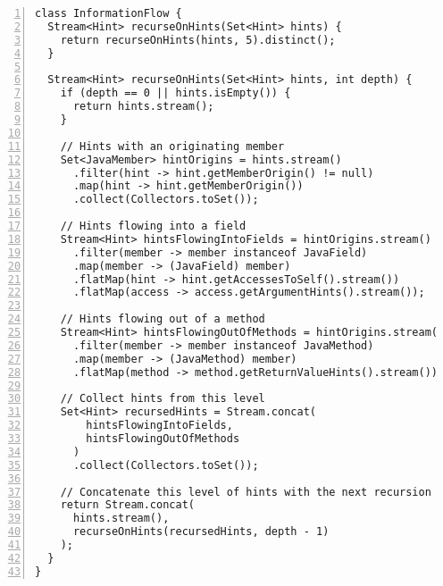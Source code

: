 \clearpage
\begin{lstlisting}[caption={Constraint 7: InformationFlow class used to recursively follow hints to their originating members. For hints originating from fields, we check all hints that flow into said field. For hints originating from methods, we check all hints that flow into the return value of the method. This process is repeated until the "breadcrumb trail" of hints is exhausted, or up to a maximum of 5 recursions.}, captionpos=b, label=lst:constraint_7_flow, numbers=left, showstringspaces=false]
class InformationFlow {
  Stream<Hint> recurseOnHints(Set<Hint> hints) {
    return recurseOnHints(hints, 5).distinct();
  }

  Stream<Hint> recurseOnHints(Set<Hint> hints, int depth) {
    if (depth == 0 || hints.isEmpty()) {
      return hints.stream();
    }

    // Hints with an originating member
    Set<JavaMember> hintOrigins = hints.stream()
      .filter(hint -> hint.getMemberOrigin() != null)
      .map(hint -> hint.getMemberOrigin())
      .collect(Collectors.toSet());

    // Hints flowing into a field
    Stream<Hint> hintsFlowingIntoFields = hintOrigins.stream()
      .filter(member -> member instanceof JavaField)
      .map(member -> (JavaField) member)
      .flatMap(hint -> hint.getAccessesToSelf().stream())
      .flatMap(access -> access.getArgumentHints().stream());

    // Hints flowing out of a method
    Stream<Hint> hintsFlowingOutOfMethods = hintOrigins.stream()
      .filter(member -> member instanceof JavaMethod)
      .map(member -> (JavaMethod) member)
      .flatMap(method -> method.getReturnValueHints().stream());

    // Collect hints from this level
    Set<Hint> recursedHints = Stream.concat(
        hintsFlowingIntoFields, 
        hintsFlowingOutOfMethods
      )
      .collect(Collectors.toSet());

    // Concatenate this level of hints with the next recursion level
    return Stream.concat(
      hints.stream(),
      recurseOnHints(recursedHints, depth - 1)
    );
  }
}
\end{lstlisting}